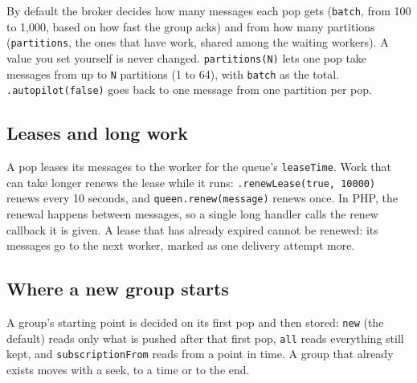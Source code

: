 By default the broker decides how many messages each pop gets (\texttt{batch}, from 100 to 1,000,
based on how fast the group acks) and from how many partitions (\texttt{partitions}, the ones that
have work, shared among the waiting workers). A value you set yourself is never changed.
\texttt{partitions(N)} lets one pop take messages from up to \texttt{N} partitions (1 to 64), with
\texttt{batch} as the total. \texttt{.autopilot(false)} goes back to one message from one partition
per pop.


\subsection{Leases and long work}

A pop leases its messages to the worker for the queue's \texttt{leaseTime}. Work that can take
longer renews the lease while it runs: \texttt{.renewLease(true, 10000)} renews every 10 seconds,
and \texttt{queen.renew(message)} renews once. In PHP, the renewal happens between messages, so a
single long handler calls the renew callback it is given. A lease that has already
expired cannot be renewed: its messages go to the next worker, marked as one delivery attempt
more.


\subsection{Where a new group starts}

A group's starting point is decided on its first pop and then stored: \texttt{new} (the default)
reads only what is pushed after that first pop, \texttt{all} reads everything still kept, and
\texttt{subscriptionFrom} reads from a point in time. A group that already exists moves with a seek,
to a time or to the end.




